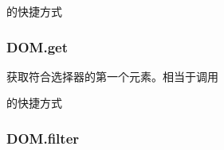 \documentclass[letterpaper,10pt,english]{sphinxmanual}
\begin{document}

\begin{fulllineitems}
\label{api/core/dom/query:DOM.KISSY.query}
{\hyperref[api/core/dom/query:DOM.query]{}} 的快捷方式

\end{fulllineitems}



\subsubsection{DOM.get}
\label{api/core/dom/get:dom-get}\label{api/core/dom/get::doc}

\begin{fulllineitems}
\label{api/core/dom/get:DOM.get}
获取符合选择器的第一个元素。相当于调用 {\hyperref[api/core/dom/query:DOM.query]{}}

\end{fulllineitems}



\begin{fulllineitems}
\label{api/core/dom/get:DOM.KISSY.get}
{\hyperref[api/core/dom/get:DOM.get]{}} 的快捷方式

\end{fulllineitems}



\subsubsection{DOM.filter}
\label{api/core/dom/filter::doc}\label{api/core/dom/filter:dom-filter}
\end{document}
